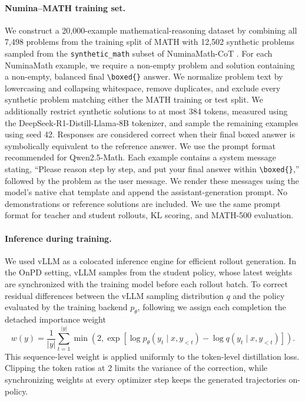 \documentclass{article} %
\theoremstyle{plain}
\theoremstyle{definition}
\theoremstyle{remark}
\begin{document}
\paragraph{Numina--MATH training set.}
We construct a 20,000-example mathematical-reasoning dataset by combining all 7,498 problems from the training split of MATH \citep{hendrycks2021measuringmathematicalproblemsolving} with 12,502 synthetic problems sampled from the \texttt{synthetic\_math} subset of NuminaMath-CoT \citep{numina_math_datasets}. For each NuminaMath example, we require a non-empty problem and solution containing a non-empty, balanced final \texttt{\textbackslash boxed\{\}} answer. We normalize problem text by lowercasing and collapsing whitespace, remove duplicates, and exclude every synthetic problem matching either the MATH training or test split. We additionally restrict synthetic solutions to at most 384 tokens, measured using the DeepSeek-R1-Distill-Llama-8B tokenizer, and sample the remaining examples using seed 42. Responses are considered correct when their final boxed answer is symbolically equivalent to the reference answer. We use the prompt format recommended for Qwen2.5-Math. Each example contains a system message stating, ``Please reason step by step, and put your final answer within \texttt{\textbackslash boxed\{\}},'' followed by the problem as the user message. We render these messages using the model's native chat template and append the assistant-generation prompt. No demonstrations or reference solutions are included. We use the same prompt format for teacher and student rollouts, KL scoring, and MATH-500 evaluation.

\paragraph{Inference during training.} We used vLLM \citep{kwon2023efficient} as a colocated inference engine for efficient rollout generation. In the OnPD setting, vLLM samples from the student policy, whose latest weights are synchronized with the training model before each rollout batch. To correct residual differences between the vLLM sampling distribution \(q\) and the policy evaluated by the training backend \(p_\theta\), following \citet{shenfeld_self-distillation_2026} we assign each completion the detached importance weight
\[
w(y)=\frac{1}{|y|}\sum_{t=1}^{|y|}\min\!\left(2,\exp\!\left[\log p_\theta(y_t\mid x,y_{<t})-\log q(y_t\mid x,y_{<t})\right]\right).
\]
This sequence-level weight is applied uniformly to the token-level distillation loss. Clipping the token ratios at \(2\) limits the variance of the correction, while synchronizing weights at every optimizer step keeps the generated trajectories on-policy.
\end{document}
